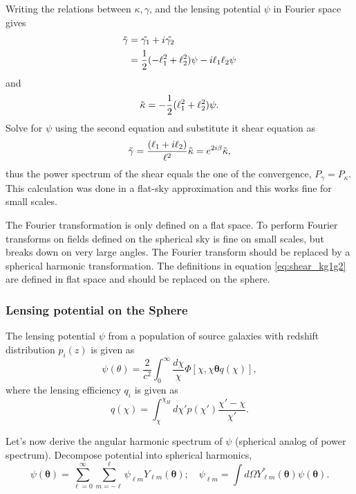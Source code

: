 Writing the relations between $\kappa, \gamma$, and the lensing potential $\psi$ in Fourier space gives
\begin{align}
    \nonumber \Tilde{\gamma} &= \Tilde{\gamma_1} + i\Tilde{\gamma_2}\\
    &= \frac{1}{2}(-\ell_1^2 + \ell_2^2)\psi - i\ell_1\ell_2\psi
\end{align}
and
\begin{align}
    \Tilde{\kappa} = -\frac{1}{2}(\ell_1^2+\ell_2^2)\psi.
\end{align}
Solve for $\psi$ using the second equation and substitute it shear equation as
\begin{equation}
    \label{eq:shear_gammakappa}
    \Tilde{\gamma} = \frac{(\ell_1+i\ell_2)}{\ell^2}\Tilde{\kappa} = e^{2i\beta}\Tilde{\kappa},
\end{equation}
thus the power spectrum of the shear equals the one of the convergence, $P_\gamma = P_\kappa$. This calculation was done in a flat-sky approximation and this works fine for small scales.

The Fourier transformation is only defined on a flat space. To perform Fourier transforms on fields defined on the spherical sky is fine on small scales, but breaks down on very large angles. The Fourier transform should be replaced by a spherical harmonic transformation. The definitions in equation \ref{eq:shear_kg1g2} are defined in flat space and should be replaced on the sphere.

\subsubsection{Lensing potential on the Sphere}

The lensing potential $\psi$ from a population of source galaxies with redshift distribution $p_i(z)$ is given as
\begin{equation}
    \label{eq:shear_pot_sphere}
    \psi(\theta) = \frac{2}{c^2}\int_0^\infty\frac{d\chi}{\chi}\Phi[\chi, \chi\bm{\theta} q(\chi)],
\end{equation}
where the lensing efficiency $q_i$ is given as
\begin{equation}
    \label{eq:shear_lensingeff}
    q(\chi) = \int_\chi^{\chi_H} d\chi' p(\chi') \frac{\chi'-\chi}{\chi'}.
\end{equation}

Let's now derive the angular harmonic spectrum of $\psi$ (spherical analog of power spectrum). Decompose potential into spherical harmonics,
\begin{equation}
    \label{eq:shear_decomp_pot}
    \psi(\bm{\theta}) = \sum_{\ell=0}^\infty \sum_{m=-\ell}^\ell \psi_{\ell m} Y_{\ell m}(\bm{\theta}); \quad \psi_{\ell m} = \int d\Omega Y^*_{\ell m}(\bm{\theta}) \psi(\bm{\theta}).
\end{equation}

